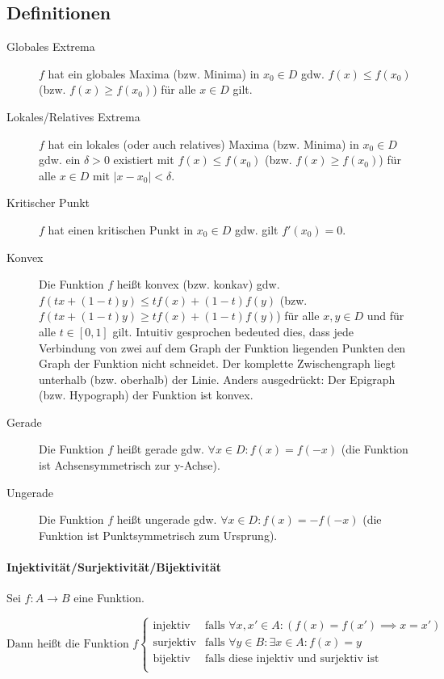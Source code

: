 \documentclass[a4paper, 11pt, accentcolor = tud3b]{tudreport}
\begin{document}
            \subsection{Definitionen}
                \begin{description}
                    \item[Globales Extrema] $ f $ hat ein globales Maxima (bzw. Minima) in $ x _ 0 \in D $ gdw. $ f(x) \leq f(x _ 0) $ (bzw. $ f(x) \geq f(x _ 0) $) für alle $ x \in D $ gilt.
                    \item[Lokales/Relatives Extrema] $ f $ hat ein lokales (oder auch relatives) Maxima (bzw. Minima) in $ x _ 0 \in D $ gdw. ein $ \delta > 0 $ existiert mit $ f(x) \leq f(x _ 0) $ (bzw. $ f(x) \geq f(x _ 0) $) für alle $ x \in D $ mit $ \lvert x - x _ 0 \rvert < \delta $.
                    \item[Kritischer Punkt] $ f $ hat einen kritischen Punkt in $ x _ 0 \in D $ gdw. gilt $ f'(x _ 0) = 0 $.
                    \item[Konvex] Die Funktion $ f $ heißt konvex (bzw. konkav) gdw. $ f(tx + (1 - t)y) \leq tf(x) + (1 - t)f(y) $ (bzw. $ f(tx + (1 - t)y) \geq tf(x) + (1 - t)f(y) $) für alle $ x, y \in D $ und für alle $ t \in [0, 1] $ gilt. Intuitiv gesprochen bedeuted dies, dass jede Verbindung von zwei auf dem Graph der Funktion liegenden Punkten den Graph der Funktion nicht schneidet. Der komplette Zwischengraph liegt unterhalb (bzw. oberhalb) der Linie. Anders ausgedrückt: Der Epigraph (bzw. Hypograph) der Funktion ist konvex.
                    \item[Gerade] Die Funktion $ f $ heißt gerade gdw. $ \forall x \in D : f(x) = f(-x) $ (die Funktion ist Achsensymmetrisch zur y-Achse).
                    \item[Ungerade] Die Funktion $ f $ heißt ungerade gdw. $ \forall x \in D : f(x) = -f(-x) $ (die Funktion ist Punktsymmetrisch zum Ursprung).
                \end{description}

                \paragraph{Injektivität/Surjektivität/Bijektivität}
                    Sei $ f : A \rightarrow B $ eine Funktion.

                    \begin{equation*}
                        \text{Dann heißt die Funktion } f
                        \begin{cases}
                            \text{injektiv} & \text{falls } \forall x, x' \in A : (f(x) = f(x') \implies x = x') \\
                            \text{surjektiv} & \text{falls } \forall y \in B : \exists x \in A : f(x) = y \\
                            \text{bijektiv} & \text{falls diese injektiv und surjektiv ist} \\
                        \end{cases}
                    \end{equation*}
\end{document}
